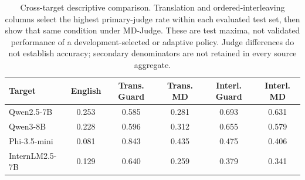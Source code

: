 \begin{table}[t]\centering
\small
\setlength{\tabcolsep}{3.5pt}
\caption{Cross-target descriptive comparison. Translation and ordered-interleaving columns select the highest primary-judge rate within each evaluated test set, then show that same condition under MD-Judge. These are test maxima, not validated performance of a development-selected or adaptive policy. Judge differences do not establish accuracy; secondary denominators are not retained in every source aggregate.}
\label{tab:targets}
\begin{tabular}{l c cc cc}\toprule
Target & English & Trans. Guard & Trans. MD & Interl. Guard & Interl. MD \\\midrule
Qwen2.5-7B & 0.253 & 0.585 & 0.281 & 0.693 & 0.631 \\
Qwen3-8B & 0.228 & 0.596 & 0.312 & 0.655 & 0.579 \\
Phi-3.5-mini & 0.081 & 0.843 & 0.435 & 0.475 & 0.406 \\
InternLM2.5-7B & 0.129 & 0.640 & 0.259 & 0.379 & 0.341 \\
\bottomrule\end{tabular}\end{table}
